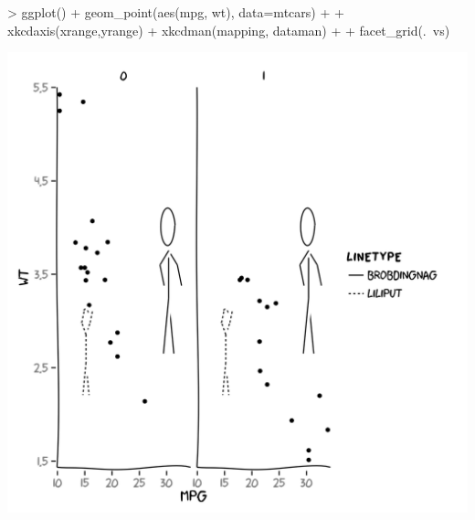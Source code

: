 \documentclass[10pt]{article}
\begin{document}
\begin{center}
\begin{Schunk}
\begin{Sinput}
> ggplot() + geom_point(aes(mpg, wt), data=mtcars) + 
+   xkcdaxis(xrange,yrange) + xkcdman(mapping, dataman) +
+   facet_grid(.~vs)
\end{Sinput}
\end{Schunk}
\includegraphics{xkcd-intro-facetvs}
\end{center}
\end{document}
